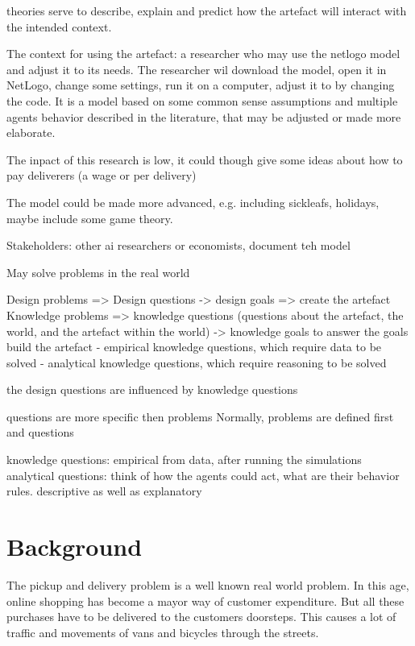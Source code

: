 theories serve to describe, explain and predict how
the artefact will interact with the intended context.

The context for using the artefact: a researcher who may use the netlogo model and adjust it to its needs.
The researcher wil download the model, open it in NetLogo, change some settings, run it on a computer, adjust it to by changing the code.
It is a model based on some common sense assumptions and multiple agents behavior described in the literature, that may be adjusted or made more elaborate.

The inpact of this research is low, it could though give some ideas about how to pay deliverers (a wage or per delivery)

The model could be made more advanced, e.g. including sickleafs, holidays, maybe include some game theory.

Stakeholders: other ai researchers or economists, document teh model

May solve problems in the real world

Design problems => Design questions -> design goals => create the artefact
Knowledge problems => knowledge questions (questions about the artefact, the world, and the artefact within the world) -> knowledge goals  to answer the goals build the artefact
- empirical knowledge questions, which require data to be solved
- analytical knowledge questions, which require reasoning to be solved

the design questions are influenced by knowledge questions

questions are more specific then problems
Normally, problems are defined first and questions

knowledge questions: empirical from data, after running the simulations
analytical questions:  think of how the agents could act, what are their behavior rules. descriptive as well as explanatory












\section{Background}
The pickup and delivery problem is a well known real world problem.
In this age, online shopping has become a mayor way of customer expenditure.
But all these purchases have to be delivered to the customers doorsteps.
This causes a lot of traffic and movements of vans and bicycles through the streets.

